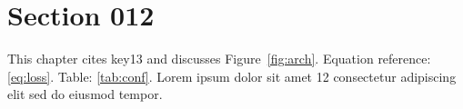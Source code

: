\section{Section 012}\label{sec:s12}
This chapter cites key13 and discusses Figure~\ref{fig:arch}.
Equation reference: \eqref{eq:loss}. Table: \ref{tab:conf}.
Lorem ipsum dolor sit amet 12 consectetur adipiscing elit sed do eiusmod tempor.
